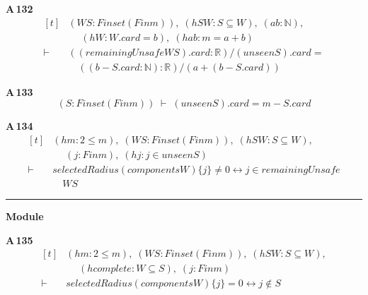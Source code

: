 \noindent\textbf{A\,132}\quad{}
{\footnotesize\[ \begin{aligned}[t]
&(\mathit{W} \mathit{S} : \mathit{Finset} (\mathit{Fin} \mathit{m})),\; (\mathit{hSW} : \mathit{S} \subseteq \mathit{W}),\; (\mathit{a} \mathit{b} : \mathbb{N} ),\\
&\quad \; (\mathit{hW} : \mathit{W}.\mathit{card}=\mathit{b}),\; (\mathit{hab} : \mathit{m}=\mathit{a}+\mathit{b})\\
\vdash\;&((\mathit{remainingUnsafe} \mathit{W} \mathit{S}).\mathit{card} : \mathbb{R} )/(\mathit{unseen} \mathit{S}).\mathit{card} =\\
&\quad ((\mathit{b}-\mathit{S}.\mathit{card} : \mathbb{N} ):\mathbb{R} )/(\mathit{a}+(\mathit{b}-\mathit{S}.\mathit{card}))
\end{aligned} \]}

\noindent\textbf{A\,133}\quad{}
{\footnotesize\[ (\mathit{S} : \mathit{Finset} (\mathit{Fin} \mathit{m})) \;\vdash\; (\mathit{unseen} \mathit{S}).\mathit{card}=\mathit{m}-\mathit{S}.\mathit{card} \]}

\noindent\textbf{A\,134}\quad{}
{\footnotesize\[ \begin{aligned}[t]
&(\mathit{hm} : 2 \leq \mathit{m}),\; (\mathit{W} \mathit{S} : \mathit{Finset} (\mathit{Fin} \mathit{m})),\; (\mathit{hSW} : \mathit{S} \subseteq \mathit{W}),\\
&\quad \; (\mathit{j} : \mathit{Fin} \mathit{m}),\; (\mathit{hj} : \mathit{j} \in \mathit{unseen} \mathit{S})\\
\vdash\;&\mathit{selectedRadius} (\mathit{components} \mathit{W}) \{ \mathit{j}\} \neq 0 \leftrightarrow \mathit{j} \in \mathit{remainingUnsafe}\\
&\quad \mathit{W} \mathit{S}
\end{aligned} \]}

\vspace{4pt}\noindent\rule{\columnwidth}{0.4pt}\par\vspace{2pt}
\noindent\textbf{Module }\par\vspace{3pt}

\noindent\textbf{A\,135}\quad{}
{\footnotesize\[ \begin{aligned}[t]
&(\mathit{hm} : 2 \leq \mathit{m}),\; (\mathit{W} \mathit{S} : \mathit{Finset} (\mathit{Fin} \mathit{m})),\; (\mathit{hSW} : \mathit{S} \subseteq \mathit{W}),\\
&\quad \; (\mathit{hcomplete} : \mathit{W} \subseteq \mathit{S}),\; (\mathit{j} : \mathit{Fin} \mathit{m})\\
\vdash\;&\mathit{selectedRadius} (\mathit{components} \mathit{W}) \{ \mathit{j}\} = 0 \leftrightarrow \mathit{j} \notin \mathit{S}
\end{aligned} \]}

